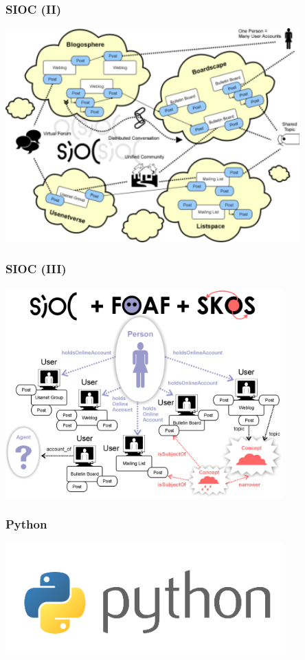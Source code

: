 \documentclass[spanish,notes=hide]{beamer}
\begin{document}
\frame
{
  \frametitle{SIOC (II)}

  \begin{center}
	\includegraphics[width=0.85\textwidth]{images/sioc-discussion.png}
  \end{center}
}
\frame
{
  \frametitle{SIOC (III)}

  \begin{center}
	\includegraphics[width=0.8\textwidth]{images/sioc-foaf-skos.png}
  \end{center}
}
\frame
{
  \frametitle{Python}

  \begin{center}
	\includegraphics[width=0.8\textwidth]{images/python.png}
  \end{center}
}
\end{document}
